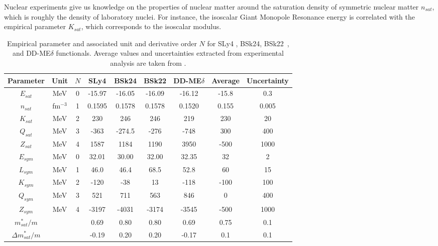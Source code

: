 Nuclear experiments give us knowledge on the properties of nuclear
matter around the saturation density of symmetric nuclear matter $n_{sat}$,
which is roughly the density of laboratory nuclei. For
instance, the isoscalar Giant Monopole Resonance energy is correlated
with the empirical parameter $K_{sat}$, which corresponds to the isoscalar
modulus.
%
\begin{table}
\begin{center}
\begin{tabular}{ccccccccc} 
  \toprule
  \toprule
  Parameter & Unit & $N$ & SLy4 & BSk24 & BSk22 & DD-ME$\delta$ & Average & Uncertainty\\
  \midrule
  $E_{sat}$ & MeV & 0         & -15.97 & -16.05  & -16.09    & -16.12 & -15.8 & 0.3   \\
  $n_{sat}$ & fm$^{-3}$ & 1   & 0.1595 &  0.1578 & 0.1578    & 0.1520 & 0.155 & 0.005 \\ 
  $K_{sat}$ & MeV & 2         & 230    &  246    & 246       & 219    & 230   & 20    \\ 
  $Q_{sat}$ & MeV & 3         & -363   &  -274.5 & -276      & -748   & 300   & 400   \\ 
  $Z_{sat}$ & MeV & 4         & 1587   &  1184   & 1190      & 3950   & -500  & 1000  \\ 
  $E_{sym}$ & MeV & 0         & 32.01  &  30.00  & 32.00     & 32.35  & 32    & 2     \\
  $L_{sym}$ & MeV & 1         & 46.0   &  46.4   & 68.5      & 52.8   & 60    & 15    \\
  $K_{sym}$ & MeV & 2         & -120   &  -38    & 13        & -118   & -100  & 100   \\
  $Q_{sym}$ & MeV & 3         & 521    &  711    & 563       & 846    & 0     & 400   \\
  $Z_{sym}$ & MeV & 4         & -3197  &  -4031  & -3174     & -3545  & -500  & 1000  \\
  $m_{sat}^*/m$ & &           & 0.69   &  0.80   & 0.80      & 0.69   & 0.75  & 0.1   \\
  $\Delta m_{sat}^*/m$ & &    & -0.19  &  0.20   & 0.20      & -0.17  & 0.1   & 0.1   \\
  \bottomrule
  \bottomrule
\end{tabular}
\end{center}
\caption[Empirical parameters for several nuclear models and from nuclear
experiments]{Empirical parameter and associated unit and derivative order $N$ for 
  SLy4 \cite{Chabanat1998}, BSk24, BSk22~\cite{Goriely2013}, and 
  DD-ME$\delta$ \cite{RocaMaza2011} functionals.
Average values and uncertainties extracted from experimental analysis are taken
from \cite{Margueron2018a}.}\label{table:emp_params}
\end{table}
